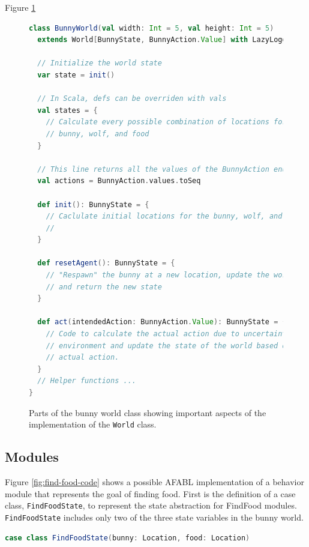 Figure \ref{fig:bunny-world-code}

\begin{figure}[ht]
\begin{center}

\begin{lstlisting}[language=Scala]
class BunnyWorld(val width: Int = 5, val height: Int = 5)
  extends World[BunnyState, BunnyAction.Value] with LazyLogging {

  // Initialize the world state
  var state = init()

  // In Scala, defs can be overriden with vals
  val states = {
    // Calculate every possible combination of locations for the
    // bunny, wolf, and food
  }

  // This line returns all the values of the BunnyAction enumeration
  val actions = BunnyAction.values.toSeq

  def init(): BunnyState = {
    // Caclulate initial locations for the bunny, wolf, and food.
    //
  }

  def resetAgent(): BunnyState = {
    // "Respawn" the bunny at a new location, update the world state
    // and return the new state
  }

  def act(intendedAction: BunnyAction.Value): BunnyState = {
    // Code to calculate the actual action due to uncertainty in the
    // environment and update the state of the world based on the
    // actual action.
  }
  // Helper functions ...
}
\end{lstlisting}

\caption{Parts of the bunny world class showing important aspects of the implementation of the {\tt World} class.}
\end{center}
\label{fig:bunny-world-code}
\end{figure}


\subsection{Modules}

Figure \ref{fig:find-food-code} shows a possible AFABL implementation of a behavior module that represents the goal of finding food. First is the definition of a case class, {\tt FindFoodState}, to represent the state abstraction for FindFood modules. {\tt FindFoodState} includes only two of the three state variables in the bunny world.

\begin{center}
\begin{lstlisting}[language=Scala,frame=none]
case class FindFoodState(bunny: Location, food: Location)
\end{lstlisting}
\end{center}

